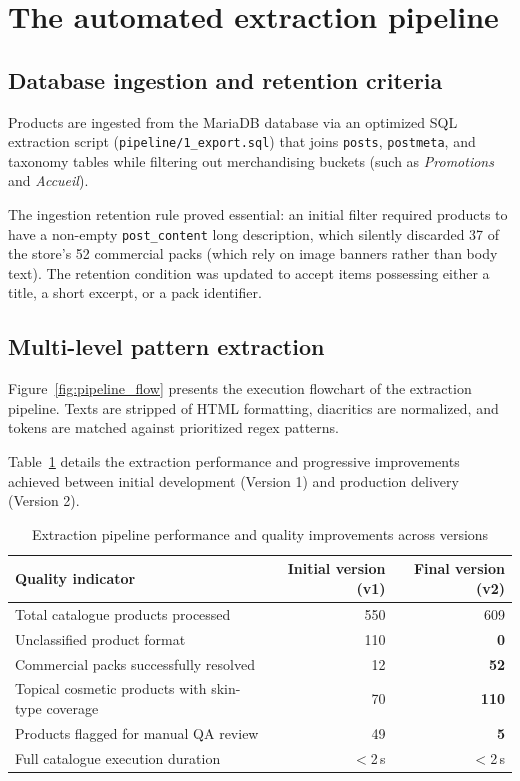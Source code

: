 \section{The automated extraction pipeline}

\subsection{Database ingestion and retention criteria}

Products are ingested from the MariaDB database via an optimized SQL extraction script (\texttt{pipeline/1\_export.sql}) that joins \texttt{posts}, \texttt{postmeta}, and taxonomy tables while filtering out merchandising buckets (such as \emph{Promotions} and \emph{Accueil}).

The ingestion retention rule proved essential: an initial filter required products to have a non-empty \texttt{post\_content} long description, which silently discarded 37 of the store's 52 commercial packs (which rely on image banners rather than body text). The retention condition was updated to accept items possessing either a title, a short excerpt, or a pack identifier.

\subsection{Multi-level pattern extraction}

Figure~\ref{fig:pipeline_flow} presents the execution flowchart of the extraction pipeline. Texts are stripped of HTML formatting, diacritics are normalized, and tokens are matched against prioritized regex patterns.


Table~\ref{tab:extraction} details the extraction performance and progressive improvements achieved between initial development (Version 1) and production delivery (Version 2).

\begin{table}[H]
\caption{Extraction pipeline performance and quality improvements across versions}
\label{tab:extraction}
\centering
\begin{tabularx}{\textwidth}{X r r}
\toprule
\textbf{Quality indicator} & \textbf{Initial version (v1)} & \textbf{Final version (v2)} \\
\midrule
Total catalogue products processed & 550 & 609 \\
Unclassified product format & 110 & \textbf{0} \\
Commercial packs successfully resolved & 12 & \textbf{52} \\
Topical cosmetic products with skin-type coverage & 70 & \textbf{110} \\
Products flagged for manual QA review & 49 & \textbf{5} \\
Full catalogue execution duration & $<$2\,s & $<$2\,s \\
\bottomrule
\end{tabularx}
\end{table}

